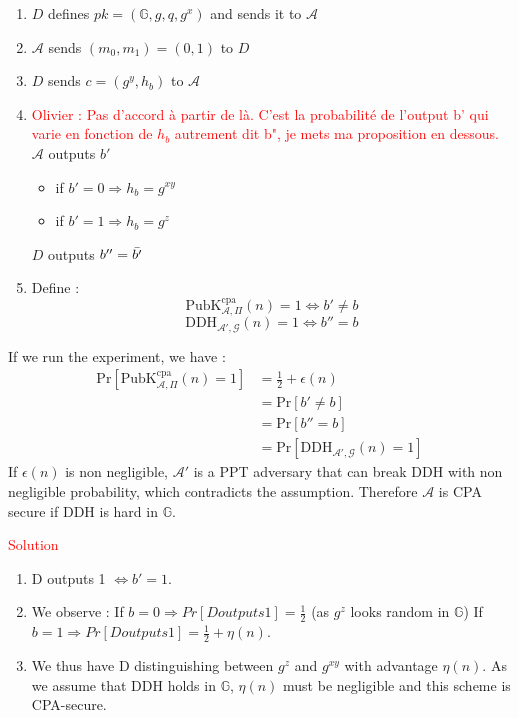 \begin{solution}
\begin{enumerate}
\begin{enumerate}
        \item $D$ defines $pk = (\mathbb{G},g,q,g^x)$ and sends it to $\mathcal{A}$
        \item $\mathcal{A}$ sends $(m_0,m_1) = (0,1)$ to $D$
        \item $D$ sends $c=(g^y,h_b)$ to $\mathcal{A}$
        \item \textcolor{red}{Olivier : Pas d'accord à partir de là. C'est la probabilité de l'output b' qui varie en fonction de $h_b$ autrement dit b", je mets ma proposition en dessous.} $\mathcal{A}$ outputs $b'$ 
            \begin{itemize}
                \item if $b'=0\Rightarrow h_b=g^{xy}$
                \item if $b'=1\Rightarrow h_b=g^z$
            \end{itemize}
            $D$ outputs $b''=\Bar{b'}$
        \item Define : $$\text{PubK}^\text{cpa}_{\mathcal{A},\Pi}(n) = 1 \Leftrightarrow b'\neq b$$ $$\text{DDH}_{\mathcal{A}',\mathcal{G}}(n) = 1 \Leftrightarrow b''=b$$
    \end{enumerate}
    If we run the experiment, we have :
    \begin{align*}
        \text{Pr}[\text{PubK}^\text{cpa}_{\mathcal{A},\Pi}(n) = 1] &= \frac{1}{2}+\epsilon(n)\\
        &= \text{Pr}[b'\neq b]\\
        &= \text{Pr}[b''=b]\\
        &= \text{Pr}[\text{DDH}_{\mathcal{A}',\mathcal{G}}(n) = 1]
    \end{align*}
    If $\epsilon(n)$ is non negligible, $\mathcal{A}'$ is a PPT adversary that can break DDH with non negligible probability, which contradicts the assumption. Therefore $\mathcal{A}$ is CPA secure if DDH is hard in $\mathbb{G}$.
\end{enumerate}

\textcolor{red}{Solution} \newline
\begin{enumerate}
    \item D outputs 1 $\Leftrightarrow b'=1$.
    \item We observe : \newline
    If $b=0 \Rightarrow Pr[D outputs 1]=\frac{1}{2}$ (as $g^z$ looks random in $\mathbb{G}$) \newline
    If $b=1 \Rightarrow Pr[D outputs 1]=\frac{1}{2}+\eta(n)$.
    \item We thus have D distinguishing between $g^z$ and $g^{xy}$ with advantage $\eta(n)$. As we assume that DDH holds in $\mathbb{G}$, $\eta(n)$ must be negligible and this scheme is CPA-secure.
\end{enumerate}

\end{solution}

